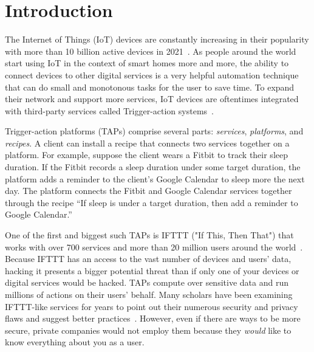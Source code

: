 \section{Introduction}
\label{sec:intro}

The Internet of Things (IoT) devices are constantly increasing in their popularity with more than 10 billion
active devices in 2021~\cite{DBLP:webpage/Bojan/IoTstats}. As people around the world start using IoT
in the context of smart homes more and more, the ability to connect devices to other digital services is a
very helpful automation technique that can do small and monotonous tasks for the user to save time. To 
expand their network and support more services, IoT devices are oftentimes integrated with third-party
services called Trigger-action systems~\cite{DBLP:journals/access/XuZZCDG19, DBLP:conf/chi/UrHBLMPSL16}.

Trigger-action platforms (TAPs) comprise several parts: \emph{services}, \emph{platforms}, and
\emph{recipes}. A client can install a recipe that connects two services together on a platform. For
example, suppose the client wears a Fitbit to track their sleep duration. If the Fitbit records a sleep
duration under some target duration, the platform adds a reminder to the client's Google Calendar to 
sleep more the next day. The platform connects the Fitbit and Google Calendar services together 
through the recipe ``If sleep is under a target duration, then add a reminder to
Google Calendar.''

One of the first and biggest such TAPs is IFTTT ("If This, Then That") that works with
over 700 services and more than 20 million users around the world~\cite{ifttt-website, DBLP:conf/sp/ChenCWSCF21}. 
Because IFTTT has an access to the vast number of devices and users' data, hacking it presents a
bigger potential threat than if only one of your devices or digital services would be hacked. TAPs
compute over sensitive data and run millions of actions on their users' behalf. Many scholars have been
examining IFTTT-like services for years to point out their numerous security
and privacy flaws and suggest better practices~\cite{DBLP:conf/sp/ChenCWSCF21, DBLP:journals/corr/abs-2009-12447, DBLP:conf/imc/MiQZW17, DBLP:journals/corr/FernandesRJP17, DBLP:conf/www/SurbatovichABDJ17, DBLP:journals/access/XuZZCDG19}. 
However, even if there are ways to be more secure, private companies would not employ them because 
they \emph{would} like to know everything about you as a user.



